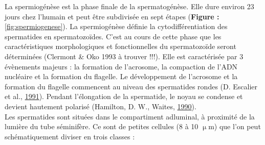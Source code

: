 \documentclass[12pt,twoside]{reedthesis}
\theoremstyle{definition}
\theoremstyle{definition}
\theoremstyle{remark}
\begin{document}
  La spermiogénèse est la phase finale de la spermatogénèse. Elle dure
  environ 23 jours chez l'humain et peut être subdivisée en sept étapes
  (\textbf{Figure : }\ref{fig:spermiogenese}). La spermiogénèse définie la
  cytodifférentiation des spermatides en spermatozoïdes. C'est au cours de
  cette phase que les caractéristiques morphologiques et fonctionnelles du
  spermatozoïde seront déterminées (Clermont \& Oko 1993 à trouver !!!).
  Elle est caractérisée par 3 évènements majeurs : la formation de
  l'acrosome, la compaction de l'ADN nucléaire et la formation du
  flagelle. Le développement de l'acrosome et la formation du flagelle
  commencent au niveau des spermatides rondes (D. Escalier et al.,
  \protect\hyperlink{ref-Escalier1991}{1991}). Pendant l'élongation de la
  spermatide, le noyau se condense et devient hautement polarisé
  (Hamilton, D. W., Waites, \protect\hyperlink{ref-Hamilton1987}{1990}).\\
  Les spermatides sont situées dans le compartiment adluminal, à proximité
  de la lumière du tube séminifère. Ce sont de petites cellules (8 à 10
  \(\upmu\)m) que l'on peut schématiquement diviser en trois classes :
  
\end{document}
